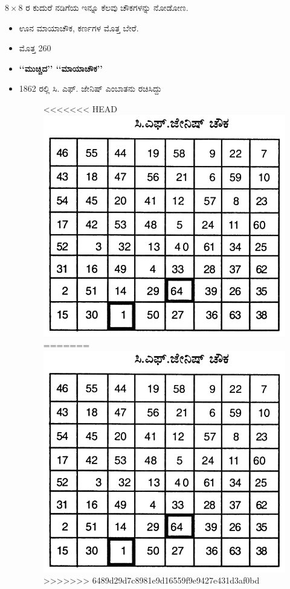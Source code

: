 $8 \times 8$ ರ ಕುದುರೆ ನಡಿಗೆಯ ಇನ್ನೂ ಕೆಲವು ಚೌಕಗಳನ್ನು ನೋಡೋಣ.
\begin{itemize}
	\item ಊನ ಮಾಯಾಚೌಕ, ಕರ್ಣಗಳ ಮೊತ್ತ ಬೇರೆ.
	\item ಮೊತ್ತ 260
	\item \textbf{‘‘ಮುಚ್ಚಿದ’’ ‘‘ಮಾಯಾಚೌಕ’’}
	\item 1862 ರಲ್ಲಿ ಸಿ. ಎಫ್. ಜೇನಿಷ್ ಎಂಬಾತನು ರಚಿಸಿದ್ದು
	\begin{figure}[H]
<<<<<<< HEAD
	\includegraphics{src/figures/chap6/fig6-5.jpg}
=======
	\includegraphics[scale=0.85]{src/figures/chap6/fig6.5.jpg}
>>>>>>> 6489d29d7c8981e9d16559f9e9427e431d3af0bd
	\end{figure}


\end{itemize}
